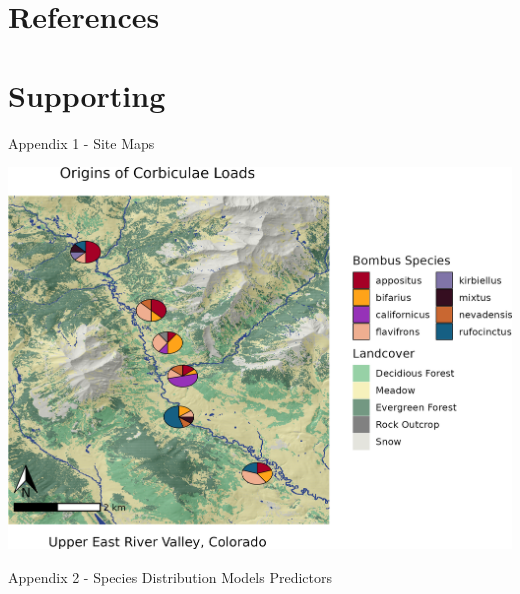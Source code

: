 \documentclass[
]{article}
\begin{document}
\hypertarget{references}{%
\section{References}\label{references}}

\hypertarget{supporting}{%
\section{Supporting}\label{supporting}}

\newpage

Appendix 1 - Site Maps

\includegraphics[width=27.01in]{../graphics/plots/siteMaps}

\newpage

Appendix 2 - Species Distribution Models Predictors
\end{document}

